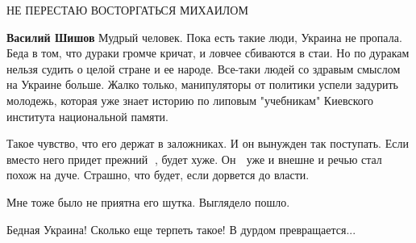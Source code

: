\begin{itemize}
 
НЕ ПЕРЕСТАЮ ВОСТОРГАТЬСЯ МИХАИЛОМ

\begin{itemize}
 
\textbf{Василий Шишов} Мудрый человек. Пока есть такие люди, Украина не
пропала. Беда в том, что дураки громче кричат, и ловчее сбиваются в стаи. Но по
дуракам нельзя судить о целой стране и ее народе. Все-таки людей со здравым
смыслом на Украине больше. Жалко только, манипуляторы от политики успели
задурить молодежь, которая уже знает историю по липовым "учебникам" Киевского
института национальной памяти.
\end{itemize}

 

Такое чувство, что его держат в заложниках. И он вынужден так поступать. Если
вместо него придет прежний 🐷, будет хуже. Он 🐖 уже и внешне и речью стал
похож на дуче. Страшно, что будет, если дорвется до власти.


 
Мне тоже было не приятна его шутка. Выглядело пошло.

 
Бедная Украина! Сколько еще терпеть такое! В дурдом превращается...


\end{itemize}
